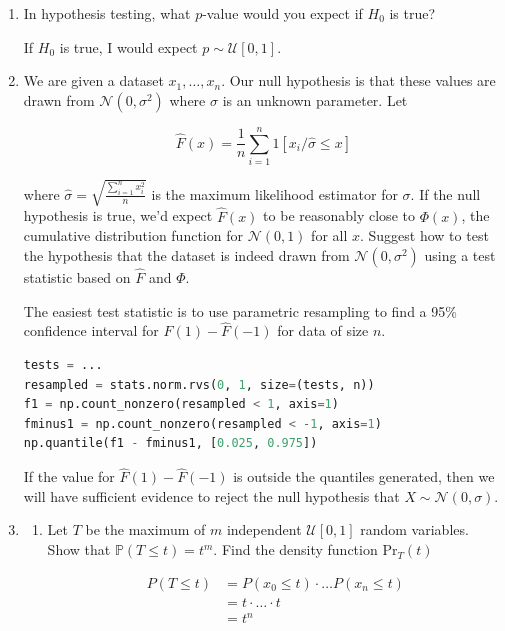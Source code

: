 \documentclass[10pt,\jkfside,a4paper]{article}
\begin{document}
\begin{enumerate}
\begin{enumerate}
\end{enumerate}

\item In hypothesis testing, what $p$-value would you expect if $H_0$ is true?

If $H_0$ is true, I would expect $p \sim \mathcal{U}[0, 1]$.

\iffalse

\item We are given a dataset $x_1, \dots, x_n$. Our null hypothesis is that
these values are drawn from $\mathcal{N}(0, \sigma^2)$ where $\sigma$ is an
unknown parameter. Let

\[
\hat{F}(x) = \frac{1}{n}\sum^{n}_{i=1} 1[x_i/\hat{\sigma}\leq x]
\]

where $\hat{\sigma} = \sqrt{\frac{\sum^n_{i=1}x_i^2}{n}}$ is the maximum
likelihood estimator for $\sigma$. If the null hypothesis is true, we'd
expect $\hat{F}(x)$ to be reasonably close to $\Phi(x)$, the cumulative
distribution function for $\mathcal{N}(0, 1)$ for all $x$. Suggest how to
test the hypothesis that the dataset is indeed drawn from $\mathcal{N}(0,
\sigma^2)$ using a test statistic based on $\hat{F}$ and $\Phi$.

The easiest test statistic is to use parametric resampling to find a 95\%
confidence interval for $\hat{F}(1) - \hat{F}(-1)$ for data of size $n$.

\begin{lstlisting}[language=Python]
tests = ...
resampled = stats.norm.rvs(0, 1, size=(tests, n))
f1 = np.count_nonzero(resampled < 1, axis=1)
fminus1 = np.count_nonzero(resampled < -1, axis=1)
np.quantile(f1 - fminus1, [0.025, 0.975])
\end{lstlisting}

If the value for $\hat{F}(1) - \hat{F}(-1)$ is outside the quantiles
generated, then we will have sufficient evidence to reject the null
hypothesis that $X\sim\mathcal{N}(0, \sigma)$.

\item

\begin{enumerate}[label=(\alph*)]

\item Let $T$ be the maximum of $m$ independent $\mathcal{U}[0, 1]$ random
variables. Show that $\mathbb{P}(T \leq t) = t^m$. Find the density function
$\text{Pr}_T(t)$

\[
\begin{split}
P(T \leq t)
&= P(x_0 \leq t) \cdot \dots P(x_n \leq t) \\
&= t \cdot \dots \cdot t \\
&= t^n \\
\end{split}
\]



\end{enumerate}
\end{enumerate}
\end{document}

